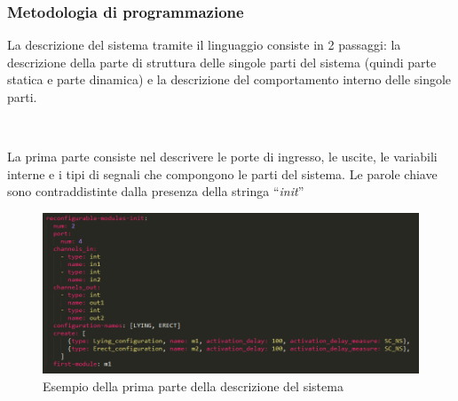 \documentclass[a4paper,titlepage]{book}
\begin{document}
\subsubsection{Metodologia di programmazione}

La descrizione del sistema tramite il linguaggio  consiste in 2 passaggi: la descrizione della parte di struttura delle singole parti del sistema (quindi parte statica e parte dinamica) e la descrizione del comportamento interno delle singole parti.

~ 

La prima parte consiste nel descrivere le porte di ingresso, le uscite, le variabili interne e i tipi di segnali che compongono le parti del sistema. Le parole chiave sono contraddistinte dalla presenza della stringa ``\textit{init}''

\begin{figure}[!ht]
\centering
\includegraphics[scale=0.6]{pyngu_init_example.png}
\caption{Esempio della prima parte della descrizione del sistema}\label{fig:10}
\end{figure}
\end{document}
